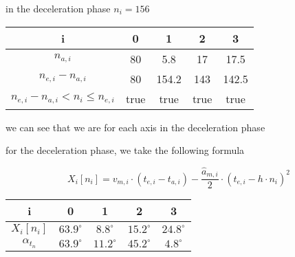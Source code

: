 \documentclass[professionalfonts, 
               xcolor={ usenames, %
                        dvipsnames,%
                        svgnames,%
                        table,%
                        hyperref%
                      }
              ]{beamer}
\begin{document}
\begin{frame}
in the deceleration phase $n_i = 156$

\begin{center}
\begin{tabular}{ccccc}
\toprule
i & 0 & 1 & 2 & 3 \\
\midrule
$n_{a,i}$ & 80 & 5.8 & 17 & 17.5 \\ 
$n_{e,i} - n_{a,i}$ & 80 & 154.2 & 143 & 142.5 \\
$n_{e,i} - n_{a,i} < n_{i} \leq n_{e,i}$ & true  & true & true & true \\
\bottomrule 
\end{tabular}
\end{center}

we can see that we are for each axis in the deceleration phase

for the deceleration phase, we take the following formula

\begin{equation*}
X_{i}[n_{i}] = v_{m,i} \cdot (t_{e,i} - t_{a,i}) - \frac{\hat{a}_{m,i}}{2} \cdot (t_{e,i} - h \cdot n_{i})^2 
\end{equation*}

\begin{center}
\begin{tabular}{ccccc}
\toprule
i & 0 & 1 & 2 & 3 \\
\midrule
$X_{i}[n_{i}]$ & $63.9^\circ$ & $8.8^\circ$ & $15.2^\circ$ & $24.8^\circ$ \\
$\alpha_{t_{n}}$ & $63.9^\circ$ & $11.2^\circ$ & $45.2^\circ$ & $4.8^\circ$ \\
\bottomrule
\end{tabular}
\end{center} 
\end{frame}
\end{document}
